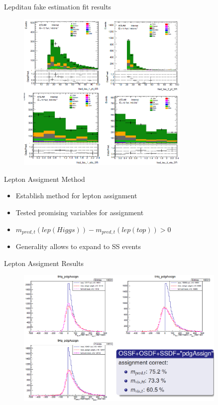 \begin{frame}{Lepditau fake estimation fit results}
    \begin{figure}
        \centering
        \includegraphics[width=0.74\textwidth]{oleh_4}
    \end{figure}
\end{frame}

\begin{frame}{Lepton Assigment Method}
    \begin{itemize}
        \item Establish method for lepton assignment
        \vspace{0.6cm}
        \item Tested promising variables for assignment
        \vspace{0.6cm}
        \item $m_{pred,t}(lep(Higgs)) - m_{pred,t}(lep(top)) > 0$
        \vspace{0.6cm}
        \item Generality allows to expand to SS events
    \end{itemize}
\end{frame}

\begin{frame}{Lepton Assigment Results}
    \begin{figure}
        \centering
        \includegraphics[width=0.9\textwidth]{assignment_results}
    \end{figure}
\end{frame}
